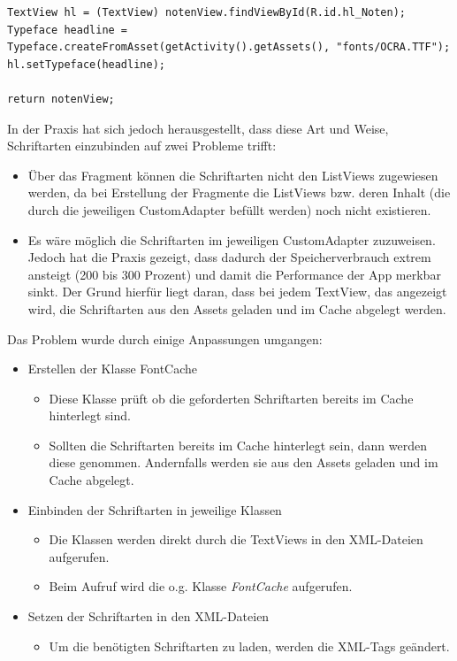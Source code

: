 \begin{description}
\begin{lstlisting}[caption={Beispiel: Einbinden der Schriftart Ocra im Notenfragment}]
TextView hl = (TextView) notenView.findViewById(R.id.hl_Noten);
Typeface headline = Typeface.createFromAsset(getActivity().getAssets(), "fonts/OCRA.TTF");
hl.setTypeface(headline);

return notenView;
\end{lstlisting}
In der Praxis hat sich jedoch herausgestellt, dass diese Art und Weise, Schriftarten einzubinden auf zwei Probleme trifft:
\begin{itemize}
\item Über das Fragment können die Schriftarten nicht den ListViews zugewiesen werden, da bei Erstellung der Fragmente die ListViews bzw. deren Inhalt (die durch die jeweiligen CustomAdapter befüllt werden) noch nicht existieren.
\item Es wäre möglich die Schriftarten im jeweiligen CustomAdapter zuzuweisen. Jedoch hat die Praxis gezeigt, dass dadurch der Speicherverbrauch extrem ansteigt (200 bis 300 Prozent) und damit die Performance der App merkbar sinkt. Der Grund hierfür liegt daran, dass bei jedem TextView, das angezeigt wird, die Schriftarten aus den Assets geladen und im Cache abgelegt werden.
\end{itemize}
Das Problem wurde durch einige Anpassungen umgangen:
\begin{itemize}
\item Erstellen der Klasse FontCache
\begin{itemize}
\item Diese Klasse prüft ob die geforderten Schriftarten bereits im Cache hinterlegt sind.
\item Sollten die Schriftarten bereits im Cache hinterlegt sein, dann werden diese genommen. Andernfalls werden sie aus den Assets geladen und im Cache abgelegt.
\end{itemize}
\item Einbinden der Schriftarten in jeweilige Klassen
\begin{itemize}
\item Die Klassen werden direkt durch die TextViews in den XML-Dateien aufgerufen.
\item Beim Aufruf wird die o.g. Klasse \textit{FontCache} aufgerufen.
\end{itemize}
\item Setzen der Schriftarten in den XML-Dateien
\begin{itemize}
\item Um die benötigten Schriftarten zu laden, werden die XML-Tags geändert.
\begin{itemize}

\end{itemize}
\end{itemize}
\end{itemize}
\end{description}
